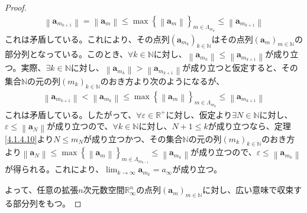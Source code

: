 \documentclass[dvipdfmx]{jsarticle}
\begin{document}
\begin{proof}
\begin{align*}
\left\| \mathbf{a}_{m_{k + 1}} \right\| = \left\| \mathbf{a}_{m} \right\| \leq \max\left\{ \left\| \mathbf{a}_{m} \right\| \right\}_{m \in \varLambda_{m_{k}}} \leq \left\| \mathbf{a}_{m_{k + 1}} \right\|
\end{align*}
これは矛盾している。これにより、その点列$\left( \mathbf{a}_{m_{k}} \right)_{k \in \mathbb{N}}$はその点列$\left( \mathbf{a}_{m} \right)_{m \in \mathbb{N}}$の部分列となっている。このとき、$\forall k \in \mathbb{N}$に対し、$\left\| \mathbf{a}_{m_{k}} \right\| \leq \left\| \mathbf{a}_{m_{k + 1}} \right\|$が成り立つ。実際、$\exists k \in \mathbb{N}$に対し、$\left\| \mathbf{a}_{m_{k}} \right\| > \left\| \mathbf{a}_{m_{k + 1}} \right\|$が成り立つと仮定すると、その集合$\mathbb{N}$の元の列$\left( m_{k} \right)_{k \in \mathbb{N}}$のおき方より次のようになるが、
\begin{align*}
\left\| \mathbf{a}_{m_{k + 1}} \right\| < \left\| \mathbf{a}_{m_{k}} \right\| \leq \max\left\{ \left\| \mathbf{a}_{m} \right\| \right\}_{m \in \varLambda_{m_{k}}} \leq \left\| \mathbf{a}_{m_{k + 1}} \right\|
\end{align*}
これは矛盾している。したがって、$\forall\varepsilon \in \mathbb{R}^{+}$に対し、仮定より$\exists N \in \mathbb{N}$に対し、$\varepsilon \leq \left\| \mathbf{a}_{N} \right\|$が成り立つので、$\forall k \in \mathbb{N}$に対し、$N + 1 \leq k$が成り立つなら、定理\ref{4.1.4.10}より$N \leq m_{N}$が成り立つかつ、その集合$\mathbb{N}$の元の列$\left( m_{k} \right)_{k \in \mathbb{N}}$のおき方より$\left\| \mathbf{a}_{N} \right\| \leq \max\left\{ \left\| \mathbf{a}_{m} \right\| \right\}_{m \in \varLambda_{m_{k - 1}}} \leq \left\| \mathbf{a}_{m_{k}} \right\|$が成り立つので、$\varepsilon \leq \left\| \mathbf{a}_{m_{k}} \right\|$が得られる。これにより、$\lim_{k \rightarrow \infty}\mathbf{a}_{m_{k}} = a_{\infty}$が成り立つ。\par
よって、任意の拡張$n$次元数空間$\mathbb{R}_{\infty}^{n}$の点列$\left( \mathbf{a}_{m} \right)_{m \in \mathbb{N}}$に対し、広い意味で収束する部分列をもつ。
\end{proof}
\end{document}
